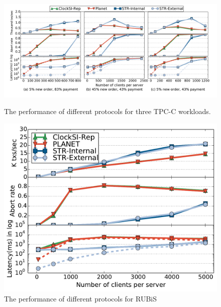 \begin{figure}
\centering
\begin{minipage}{.72\textwidth}
\centering
  \includegraphics[scale=0.3]{figures/tpcc}
  \vspace{-5mm}
  \caption{\small The performance of different protocols for three TPC-C workloads.}
  \label{fig:tpcc}
\end{minipage}
\begin{minipage}{.26\textwidth}
\centering
  \includegraphics[scale=0.28]{figures/rubislatencywarehouse}
  \vspace{-2mm}
  \caption{\small The performance of different protocols for RUBiS}
  \label{fig:rubis}
\end{minipage}
\end{figure}


